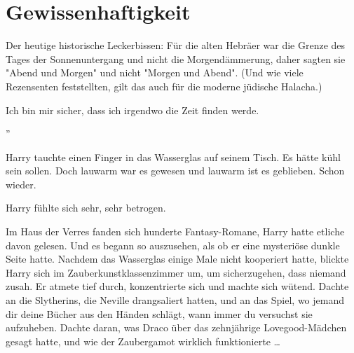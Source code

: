 \chapter{Gewissenhaftigkeit}

\begin{chapterOpeningAuthorNote}
% 
Der heutige historische Leckerbissen: Für die alten Hebräer war die Grenze des Tages der Sonnenuntergang und nicht die Morgendämmerung, daher sagten sie "Abend und Morgen" und nicht "Morgen und Abend". (Und wie viele Rezensenten feststellten, gilt das auch für die moderne jüdische Halacha.)
\end{chapterOpeningAuthorNote}
\begin{chapterOpeningQuote}
Ich bin mir sicher, dass ich irgendwo die Zeit finden werde.
\end{chapterOpeningQuote}

”

\hplettrineextrapara
Harry tauchte einen Finger in das Wasserglas auf seinem Tisch. Es hätte kühl sein sollen. Doch lauwarm war es gewesen und lauwarm ist es geblieben. Schon wieder. 

Harry fühlte sich sehr, sehr betrogen. 

Im Haus der Verres fanden sich hunderte Fantasy-Romane, Harry hatte etliche davon gelesen. Und es begann so auszusehen, als ob er eine mysteriöse dunkle Seite hatte. Nachdem das Wasserglas einige Male nicht kooperiert hatte, blickte Harry sich im Zauberkunstklassenzimmer um, um sicherzugehen, dass niemand zusah. Er atmete tief durch, konzentrierte sich und machte sich wütend. Dachte an die Slytherins, die Neville drangsaliert hatten, und an das Spiel, wo jemand dir deine Bücher aus den Händen schlägt, wann immer du versuchst sie aufzuheben. Dachte daran, was Draco über das zehnjährige Lovegood-Mädchen gesagt hatte, und wie der Zaubergamot wirklich funktionierte … 

